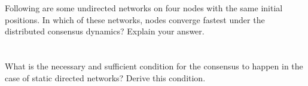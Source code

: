 \documentclass[]{article}
\numberwithin{equation}{section}
\begin{document}
\section{}
Following are some undirected networks on four nodes with the same initial positions.
In which of these networks, nodes converge fastest under the distributed consensus dynamics? 
Explain your answer.













\section{}
What is the necessary and sufficient condition for the consensus to happen in the case of static directed networks? 
Derive this condition.


















\newpage
\appendix




\cite{*}
\end{document}

